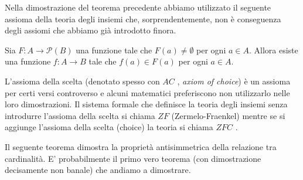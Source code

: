 Nella dimostrazione del teorema precedente abbiamo utilizzato il seguente assioma 
della teoria degli insiemi che, sorprendentemente, non è conseguenza degli assiomi 
che abbiamo già introdotto finora.

\begin{axiom}%
  \label{axiom:AC}%
  Sia $F\colon A \to \mathcal P(B)$
  una funzione tale che $F(a)\neq \emptyset$ 
  per ogni $a\in A$. Allora esiste una funzione
  $f\colon A \to B$ tale che $f(a)\in F(a)$
  per ogni $a\in A$.
\end{axiom}

L'assioma della scelta (denotato spesso con \emph{$AC$}%
%
, \emph{axiom of choice})
è un assioma per certi versi controverso
e alcuni matematici preferiscono non utilizzarlo nelle loro dimostrazioni.
Il sistema formale che definisce la teoria degli insiemi senza 
introdurre l'assioma della scelta 
si chiama \emph{$ZF$}%
%
 (Zermelo-Fraenkel) mentre 
se si aggiunge l'assioma della scelta (choice) la teoria si chiama 
\emph{$ZFC$}%
%
.

Il seguente teorema dimostra la proprietà antisimmetrica 
della relazione tra cardinalità. 
E' probabilmente il primo vero teorema (con dimostrazione decisamente non banale) 
che andiamo a dimostrare.

